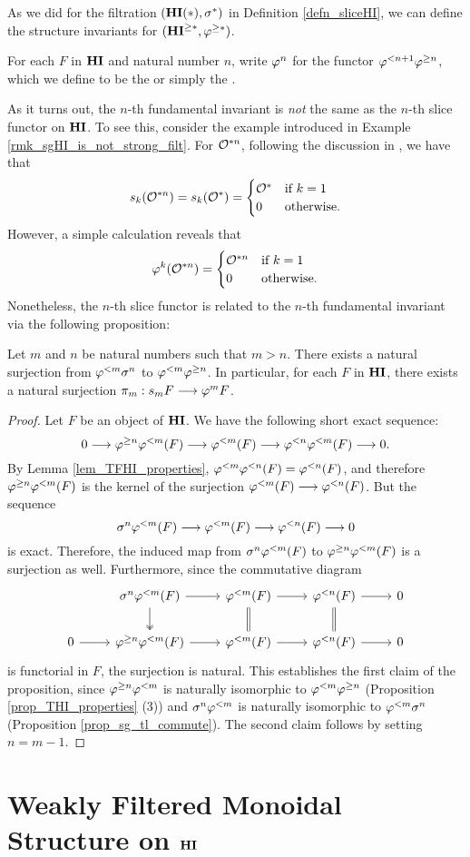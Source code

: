 As we did for the filtration $(\mathbf{HI}(*), \sigma^{*})$ in Definition
\ref{defn_sliceHI}, we can define the structure invariants for
$(\mathbf{HI}^{\geq *}, \varphi^{\geq *})$.
\begin{defn}
For each $F$ in $\mathbf{HI}$ and natural number $n$, write $\varphi^{n}$ 
for the functor $\varphi^{< n + 1} \varphi^{\geq n}$, which we define to be the 
or simply the .
\end{defn}

As it turns out, the $n$-th fundamental invariant is \emph{not} 
the same as the $n$-th slice functor on $\mathbf{HI}$. To see this, 
consider the example introduced in Example
\ref{rmk_sgHI_is_not_strong_filt}. For $\mathcal{O}^{* n}$, following the
discussion in \loccit, we have that
\[
s_k(\mathcal{O}^{* n}) = s_k(\mathcal{O}^*) = \begin{cases}
\mathcal{O}^* &\textrm{if }k = 1\\
0   &\textrm{otherwise}.
\end{cases}
\]
However, a simple calculation reveals that
\[
\varphi^{k}(\mathcal{O}^{* n}) = \begin{cases}
\mathcal{O}^{* n} &\textrm{if }k = 1\\
0     &\textrm{otherwise}.
\end{cases}
\]
Nonetheless, the $n$-th slice functor is related to the $n$-th
fundamental invariant via the following proposition:

\begin{prop}\label{prop_struct_consts}
Let $m$ and $n$ be natural numbers such that $m > n$. There exists 
a natural surjection from $\varphi^{< m} \sigma^{n}$ to $\varphi^{< m} 
\varphi^{\geq n}$. In particular, for each $F$ in $\mathbf{HI}$, there exists a 
natural surjection $\pi_m: s_m F \longrightarrow \varphi^{m} F$.
\end{prop}
\begin{proof}
Let $F$ be an object of $\mathbf{HI}$. We have the following short exact
sequence:
\[
0 \longrightarrow \varphi^{\geq n} \varphi^{< m}(F) \longrightarrow \varphi^{< m}(F) \longrightarrow 
  \varphi^{< n} \varphi^{< m}(F) \longrightarrow 0.
\]
By Lemma \ref{lem_TFHI_properties}, $\varphi^{< m} \varphi^{< n}(F) 
= \varphi^{< n}(F)$, and therefore $\varphi^{\geq n} \varphi^{< m}(F)$ is the kernel 
of the surjection $\varphi^{< m}(F) \longrightarrow \varphi^{< n}(F)$. But the sequence
\[
\sigma^{n} \varphi^{< m}(F) \longrightarrow \varphi^{< m}(F) \longrightarrow \varphi^{< n}(F) \longrightarrow 0
\]
is exact. Therefore, the induced map from $\sigma^{n} \varphi^{< m}(F)$
to $\varphi^{\geq n} \varphi^{< m}(F)$ is a surjection as well. Furthermore,
since the commutative diagram
\[
\begin{tikzcd}
{} & \sgHI{n} \tlHI{m}(F) \arrow{r} \arrow[twoheadrightarrow]{d} &
\tlHI{m}(F) \arrow{r} \arrow[equal]{d} &
\tlHI{n}(F) \arrow{r} \arrow[equal]{d} &
0 \\
0 \arrow{r} &
\tgHI{n} \tlHI{m}(F) \arrow{r} &
\tlHI{m}(F) \arrow{r} &
\tlHI{n}(F) \arrow{r} &
0
\end{tikzcd}
\] 
is functorial in $F$, the surjection is natural. This establishes the
first claim of the proposition, since $\varphi^{\geq n} \varphi^{< m}$ is naturally
isomorphic to $\varphi^{< m} \varphi^{\geq n}$ (Proposition
\ref{prop_THI_properties} (3)) and $\sigma^{n} \varphi^{< m}$ is naturally
isomorphic to $\varphi^{< m} \sigma^{n}$ (Proposition
\ref{prop_sg_tl_commute}). The second claim follows by setting $n = m
- 1$.
\end{proof}

\section{Weakly Filtered Monoidal Structure on $\mathbf{HI}$}


